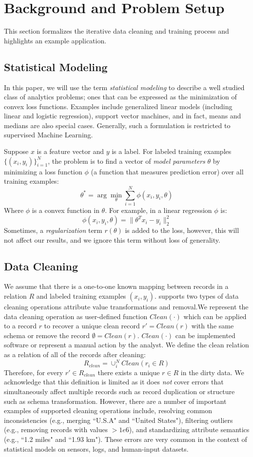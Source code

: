 \section{Background and Problem Setup}\label{background}
This section formalizes the iterative data cleaning and training process and highlights an example application.

\subsection{Statistical Modeling}
In this paper, we will use the term \emph{statistical modeling} to describe a well studied class of analytics problems; ones that can be expressed as the minimization of convex loss functions.
Examples include generalized linear models (including linear and logistic regression), support vector machines, and in fact, means and medians are also special cases. 
Generally, such a formulation is restricted to supervised Machine Learning.

Suppose $x$ is a feature vector and $y$ is a label.
For labeled training examples $\{(x_{i},y_{i})\}_{i=1}^{N}$, the problem is to find a vector of \emph{model parameters} $\theta$ by minimizing a loss function $\phi$ (a function that measures prediction error) over all training examples:
\[
 \theta^{*}=\arg\min_{\theta}\sum_{i=1}^{N}\phi(x_{i},y_{i},\theta)
\]
Where $\phi$ is a convex function in $\theta$.
For example, in a linear regression $\phi$ is:
\[
\phi(x_{i},y_{i},\theta) = \|\theta^Tx_{i} - y_i \|_2^2
\]
Sometimes, a \emph{regularization} term $r(\theta)$ is added to the loss, however, this will not affect our results, and we ignore this term without loss of generality.

\subsection{Data Cleaning}
We assume that there is a one-to-one known mapping between records in a relation $R$ and labeled training examples $(x_{i},y_{i})$.
\sys supports two types of data cleaning operations attribute value transformations and removal.We represent the data cleaning operation as user-defined function $Clean(\cdot)$ which can be applied to a record $r$ to recover a unique clean record $r' = Clean(r)$ with the same schema or remove the record $\emptyset = Clean(r)$.
$Clean(\cdot)$ can be implemented software or represent a manual action by the analyst.
We define the clean relation as a relation of all of the records after cleaning:
\[R_{clean} = \cup_i^N Clean(r_i \in R)\]
Therefore, for every $r' \in R_{clean}$ there exists a unique $r \in R$ in the dirty data.
We acknowledge that this definition is limited as it does \emph{not} cover errors that simultaneously affect multiple records such as record duplication or structure such as schema transformation.
However, there are a number of important examples of supported cleaning operations include, resolving common inconsistencies (e.g., merging ``U.S.A" and ``United States"), filtering outliers (e.g., removing records with values $>1e6$), and standardizing attribute semantics (e.g., ``1.2 miles" and ``1.93 km").
These errors are very common in the context of statistical models on sensors, logs, and human-input datasets. 


